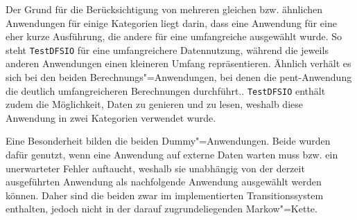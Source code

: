 Der Grund für die Berücksichtigung von mehreren gleichen bzw. ähnlichen Anwendungen für einige Kategorien liegt darin, dass eine Anwendung für eine eher kurze Ausführung, die andere für eine umfangreiche ausgewählt wurde. So steht \texttt{TestDFSIO} für eine umfangreichere Datennutzung, während die jeweils anderen Anwendungen einen kleineren Umfang repräsentieren. Ähnlich verhält es sich bei den beiden Berechnungs"=Anwendungen, bei denen die \acl{pent}-Anwendung die deutlich umfangreicheren Berechnungen durchführt.. \texttt{TestDFSIO} enthält zudem die Möglichkeit, Daten zu genieren und zu lesen, weshalb diese Anwendung in zwei Kategorien verwendet wurde.

Eine Besonderheit bilden die beiden Dummy"=Anwendungen. Beide wurden dafür genutzt, wenn eine Anwendung auf externe Daten warten muss bzw. ein unerwarteter Fehler auftaucht, weshalb sie unabhängig von der derzeit ausgeführten Anwendung als nachfolgende Anwendung ausgewählt werden können. Daher sind die beiden zwar im implementierten Transitionssystem enthalten, jedoch nicht in der darauf zugrundeliegenden Markow"=Kette.

